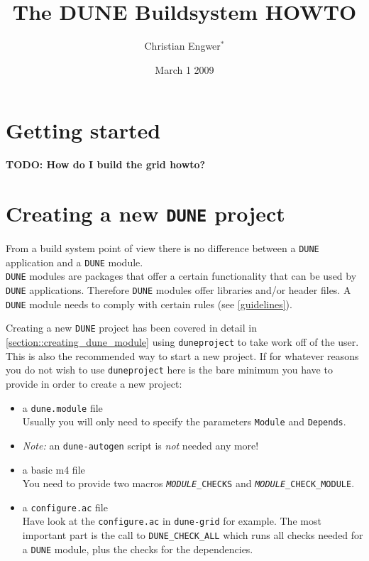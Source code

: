 \documentclass[11pt,a4paper,headinclude,footinclude,DIV16,normalheadings]{scrartcl}
\title{The DUNE Buildsystem HOWTO}
\author{Christian Engwer$^\ast$ 
}
\date{March 1 2009}
\newcommand{\dune}{\texttt{DUNE}\xspace}
\newcommand{\autogen}{\texttt{dune-autogen}\xspace}
\newcommand{\configureac}{\texttt{configure.ac}\xspace}
\newcommand{\dunegrid}{\texttt{dune-grid}\xspace}
\newcommand{\duneproject}{\texttt{duneproject}\xspace}
\newcommand{\dunemodule}{\texttt{dune.module}\xspace}
\begin{document}
\maketitle
\tableofcontents
\pagebreak

\section{Getting started}\label{section::getting_started}

\textbf{TODO: How do I build the grid howto?}

\section{Creating a new \dune project}\label{section::creating_new_dune_project}

From a build system point of view there is no difference between a \dune
application and a \dune module.\\

\dune modules are packages that offer a certain functionality that can
be used by \dune applications. Therefore \dune modules offer libraries
and/or header files. A \dune module needs to comply with certain rules
(see \ref{guidelines}).

Creating a new \dune project has been covered in detail in 
\ref{section::creating_dune_module} using \texttt{duneproject} to take
work off of the user. This is also the recommended way to start a new project. 
If for whatever reasons you do not wish to use \duneproject here is 
the bare minimum you have to provide in order to create a new project:
\begin{itemize}
\item a \dunemodule file\\
  Usually you will only need to specify the parameters \texttt{Module}
  and \texttt{Depends}.
\item \emph{Note:} an \autogen script is \emph{not} needed any more!
\item a basic m4 file\\
  You need to provide two macros \texttt{\emph{MODULE}\_CHECKS}
  and \texttt{\emph{MODULE}\_CHECK\_MODULE}.
\item a \configureac file\\
  Have look at the \configureac in \dunegrid for example. The most
  important part is the call to \texttt{DUNE\_CHECK\_ALL} which
  runs all checks needed for a \dune module, plus the checks for the
  dependencies.
\end{itemize}
\end{document}
